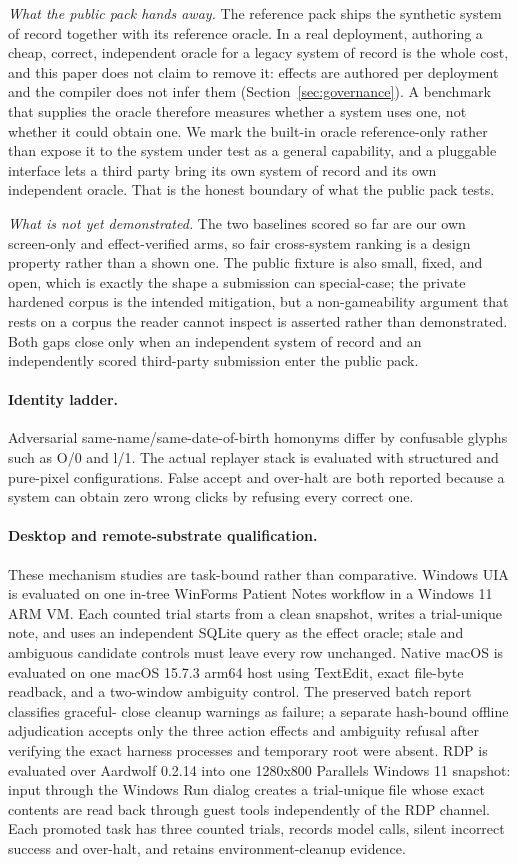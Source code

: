 \emph{What the public pack hands away.} The reference pack ships the synthetic
system of record together with its reference oracle. In a real deployment,
authoring a cheap, correct, independent oracle for a legacy system of record is
the whole cost, and this paper does not claim to remove it: effects are authored
per deployment and the compiler does not infer them
(Section~\ref{sec:governance}). A benchmark that supplies the oracle therefore
measures whether a system uses one, not whether it could obtain one. We mark the
built-in oracle reference-only rather than expose it to the system under test as
a general capability, and a pluggable interface lets a third party bring its own
system of record and its own independent oracle. That is the honest boundary of
what the public pack tests.

\emph{What is not yet demonstrated.} The two baselines scored so far are our own
screen-only and effect-verified arms, so fair cross-system ranking is a design
property rather than a shown one. The public fixture is also small, fixed, and
open, which is exactly the shape a submission can special-case; the private
hardened corpus is the intended mitigation, but a non-gameability argument that
rests on a corpus the reader cannot inspect is asserted rather than
demonstrated. Both gaps close only when an independent system of record and an
independently scored third-party submission enter the public pack.

\paragraph{Identity ladder.}
Adversarial same-name/same-date-of-birth homonyms differ by confusable glyphs
such as O/0 and l/1. The actual replayer stack is evaluated with structured and
pure-pixel configurations. False accept and over-halt are both reported because
a system can obtain zero wrong clicks by refusing every correct one.

\paragraph{Desktop and remote-substrate qualification.}
These mechanism studies are task-bound rather than comparative. Windows UIA is
evaluated on one in-tree WinForms Patient Notes workflow in a Windows 11 ARM VM.
Each counted trial starts from a clean snapshot, writes a trial-unique note, and
uses an independent SQLite query as the effect oracle; stale and ambiguous
candidate controls must leave every row unchanged. Native macOS is evaluated on
one macOS 15.7.3 arm64 host using TextEdit, exact file-byte readback, and a
two-window ambiguity control. The preserved batch report classifies graceful-
close cleanup warnings as failure; a separate hash-bound offline adjudication
accepts only the three action effects and ambiguity refusal after verifying the
exact harness processes and temporary root were absent. RDP is evaluated over
Aardwolf 0.2.14 into one 1280x800 Parallels Windows 11 snapshot: input through
the Windows Run dialog creates a trial-unique file whose exact contents are read
back through guest tools independently of the RDP channel. Each promoted task
has three counted trials, records model calls, silent incorrect success and
over-halt, and retains environment-cleanup evidence.
